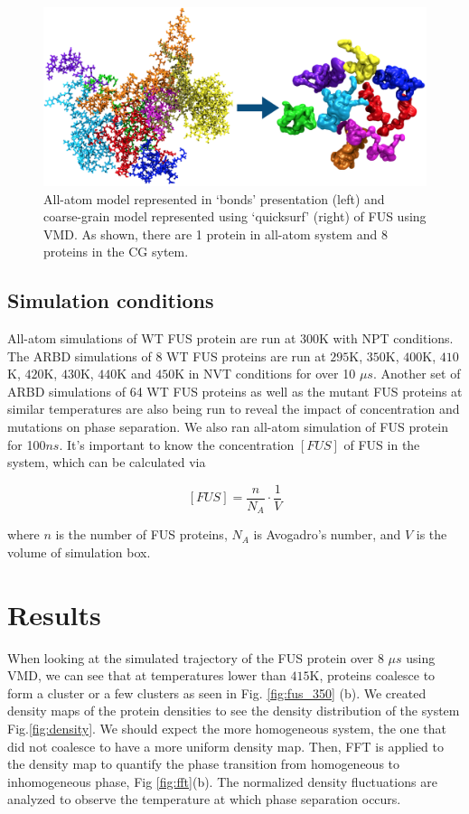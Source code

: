 \documentclass[12ptr]{article}
\begin{document}
\begin{figure}[!ht]
\centering
\includegraphics[width=6in]{together_b}
 \caption {\small All-atom model represented in `bonds' presentation (left) and coarse-grain model represented using `quicksurf' (right) of FUS  using VMD. As shown, there are 1 protein in all-atom system and 8 proteins in the CG sytem.}
 \label{fig:fus_both}
\end{figure}


\subsection{Simulation conditions}
All-atom simulations of WT FUS protein are run at $300$K with NPT conditions. The ARBD simulations of 8 WT FUS proteins are run at $295$K, $350$K, $400$K, $410$K, $420$K, $430$K, $440$K and $450$K in NVT conditions for over 10 $\mu s$. Another set of ARBD simulations of 64 WT FUS proteins as well as the mutant FUS proteins at similar temperatures are also being run to reveal the impact of concentration and mutations on phase separation. We also ran all-atom simulation of FUS protein for 100$ns$. It's important to know the concentration  $[FUS]$ of FUS in the system, which can be calculated via

\[ [FUS]=\frac{n}{N_A} \cdot \frac{1}{V} \]

\noindent where $n$ is the number of FUS proteins, $N_A$ is Avogadro's number, and $V$ is the volume of simulation box. 



\section{Results}

When looking at the simulated trajectory of the FUS protein over 8 $\mu s$ using VMD, we can see that at temperatures lower than $415$K, proteins coalesce to form a cluster or a few clusters as seen in Fig. \ref{fig:fus_350} (b). We created density maps of the protein densities to see the density distribution of the system Fig.\ref{fig:density}. We should expect the more homogeneous system, the one that did not coalesce to have a more uniform density map. Then, FFT is applied to the density map to quantify the phase transition from homogeneous to inhomogeneous phase, Fig \ref{fig:fft}(b). The normalized density fluctuations are analyzed to observe the temperature at which phase separation occurs. 
\end{document}
